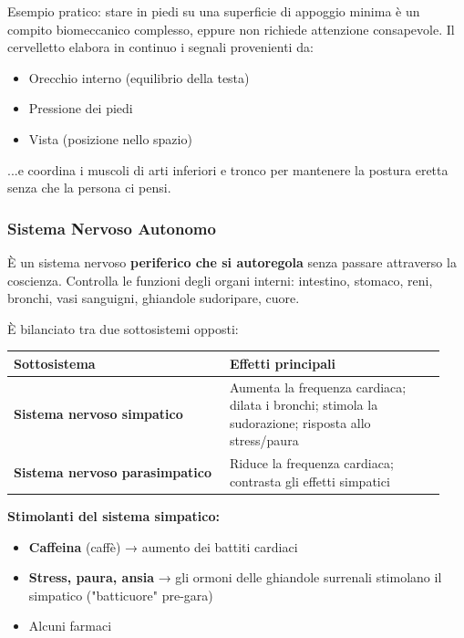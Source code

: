 \documentclass[a4paper,11pt]{article}
\providecommand{\tightlist}{%
  \setlength{\itemsep}{0pt}\setlength{\parskip}{0pt}}
\begin{document}
Esempio pratico: stare in piedi su una superficie di appoggio minima è
un compito biomeccanico complesso, eppure non richiede attenzione
consapevole. Il cervelletto elabora in continuo i segnali provenienti
da:

\begin{itemize}
      \tightlist
      \item
            Orecchio interno (equilibrio della testa)
      \item
            Pressione dei piedi
      \item
            Vista (posizione nello spazio)
\end{itemize}

...e coordina i muscoli di arti inferiori e tronco per mantenere la
postura eretta senza che la persona ci pensi.

\subsubsection{Sistema Nervoso Autonomo}\label{sistema-nervoso-autonomo}

È un sistema nervoso \textbf{periferico che si autoregola} senza passare
attraverso la coscienza. Controlla le funzioni degli organi interni:
intestino, stomaco, reni, bronchi, vasi sanguigni, ghiandole sudoripare,
cuore.

È bilanciato tra due sottosistemi opposti:

\begin{longtable}[]{@{}p{0.47\linewidth}p{0.47\linewidth}@{}}
      \toprule\noalign{}
      Sottosistema                           & Effetti principali             \\
      \midrule\noalign{}
      \endhead
      \bottomrule\noalign{}
      \endlastfoot
      \textbf{Sistema nervoso simpatico}     & Aumenta la frequenza cardiaca;
      dilata i bronchi; stimola la sudorazione; risposta allo stress/paura    \\
      \textbf{Sistema nervoso parasimpatico} & Riduce la frequenza cardiaca;
      contrasta gli effetti simpatici                                         \\
\end{longtable}

\textbf{Stimolanti del sistema simpatico:}

\begin{itemize}
      \tightlist
      \item
            \textbf{Caffeina} (caffè) → aumento dei battiti cardiaci
      \item
            \textbf{Stress, paura, ansia} → gli ormoni delle ghiandole surrenali
            stimolano il simpatico ("batticuore" pre-gara)
      \item
            Alcuni farmaci
\end{itemize}
\end{document}
